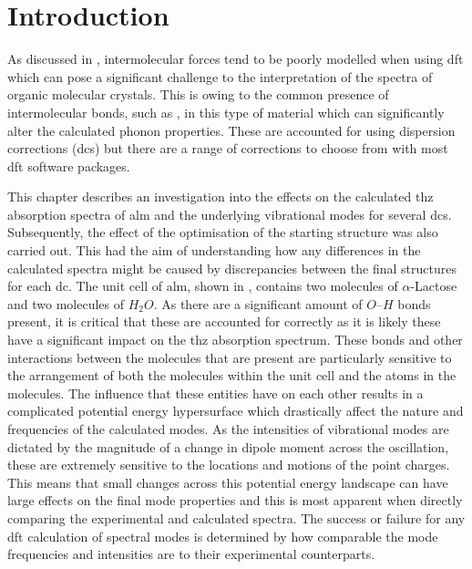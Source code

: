 \section{Introduction}
As discussed in , intermolecular forces tend to be poorly modelled when using \acrshort{dft} which can pose a significant challenge to the interpretation of the spectra of organic molecular crystals. This is owing to the common presence of intermolecular bonds, such as \DIFdelbegin {}\DIFdelend \DIFaddbegin {}\nobreakdash{}\DIFaddend , in this type of material which can significantly alter the calculated phonon properties. These are accounted for using dispersion corrections (\acrshort{dc}s) but there are a range of corrections to choose from with most \acrshort{dft} software packages. 

This chapter describes an investigation into the effects on the calculated \acrshort{thz} absorption spectra of \acrshort{alm} and the underlying vibrational modes for several \acrshort{dc}s. Subsequently, the effect of the optimisation of the starting structure was also carried out. This had the aim of understanding how any differences in the calculated spectra might be caused by discrepancies between the final structures for each \acrshort{dc}. The unit cell of \acrshort{alm}, shown in , contains two molecules of \(\alpha\)\nobreakdash-Lactose and two molecules of \(H_2O\). As there are a significant amount of \(O\)\nobreakdash--\(H\) bonds present, it is critical that these are accounted for correctly as it is likely these have a significant impact on the \acrshort{thz} absorption spectrum. These bonds and other interactions between the molecules that are present are particularly sensitive to the arrangement of both the molecules within the unit cell and the atoms in the molecules. The influence that these entities have on each other results in a complicated potential energy hypersurface which drastically affect the nature and frequencies of the calculated modes. As the intensities of vibrational modes are dictated by the magnitude of a change in dipole moment across the oscillation, these are extremely sensitive to the locations and motions of the point charges. This means that small changes across this potential energy landscape can have large effects on the final mode properties and this is most apparent when directly comparing the experimental and calculated spectra. The success or failure for any \acrshort{dft} calculation of spectral modes is determined by how comparable the mode frequencies and intensities are to their experimental counterparts. 

